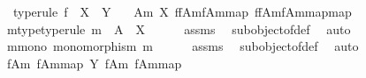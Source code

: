\begin{isabellebody}
\ \ type{\isacharunderscore}{\kern0pt}rule{\isacharbrackright}{\kern0pt}{\isacharcolon}{\kern0pt}\ {\isachardoublequoteopen}f\ {\isacharcolon}{\kern0pt}\ X\ {\isasymrightarrow}\ Y{\isachardoublequoteclose}\isanewline
\ \ \ {\isachardoublequoteopen}{\isacharparenleft}{\kern0pt}A{\isacharcomma}{\kern0pt}m{\isacharparenright}{\kern0pt}\ {\isasymsubseteq}\isactrlbsub X\isactrlesub \ {\isacharparenleft}{\kern0pt}f\isactrlsup {\isacharminus}{\kern0pt}f{\isasymlparr}A{\isasymrparr}\isactrlbsub m\isactrlesub {\isasymrparr}\isactrlbsub {\isacharbrackleft}{\kern0pt}f{\isasymlparr}A{\isasymrparr}\isactrlbsub m\isactrlesub {\isacharbrackright}{\kern0pt}map\isactrlesub {\isacharcomma}{\kern0pt}\ {\isacharbrackleft}{\kern0pt}f\isactrlsup {\isacharminus}{\kern0pt}f{\isasymlparr}A{\isasymrparr}\isactrlbsub m\isactrlesub {\isasymrparr}\isactrlbsub {\isacharbrackleft}{\kern0pt}f{\isasymlparr}A{\isasymrparr}\isactrlbsub m\isactrlesub {\isacharbrackright}{\kern0pt}map\isactrlesub {\isacharbrackright}{\kern0pt}map{\isacharparenright}{\kern0pt}{\isachardoublequoteclose}\isanewline
%
\isadelimproof
%
\endisadelimproof
%
\isatagproof
{}\isamarkupfalse%
\ {\isacharminus}{\kern0pt}\isanewline
\ \ \isamarkupfalse%
\ m{\isacharunderscore}{\kern0pt}type{\isacharbrackleft}{\kern0pt}type{\isacharunderscore}{\kern0pt}rule{\isacharbrackright}{\kern0pt}{\isacharcolon}{\kern0pt}\ {\isachardoublequoteopen}m\ {\isacharcolon}{\kern0pt}\ A\ {\isasymrightarrow}\ X{\isachardoublequoteclose}\isanewline
\ \ \ \ \isamarkupfalse%
\ assms{\isacharparenleft}{\kern0pt}{}{\isacharparenright}{\kern0pt}\ \isamarkupfalse%
\ subobject{\isacharunderscore}{\kern0pt}of{\isacharunderscore}{\kern0pt}def{}\ \isamarkupfalse%
\ auto\isanewline
\ \ \isamarkupfalse%
\ m{\isacharunderscore}{\kern0pt}mono{\isacharcolon}{\kern0pt}\ {\isachardoublequoteopen}monomorphism\ m{\isachardoublequoteclose}\isanewline
\ \ \ \ \isamarkupfalse%
\ assms{\isacharparenleft}{\kern0pt}{}{\isacharparenright}{\kern0pt}\ \isamarkupfalse%
\ subobject{\isacharunderscore}{\kern0pt}of{\isacharunderscore}{\kern0pt}def{}\ \isamarkupfalse%
\ auto\isanewline
\isanewline
\ \ \isamarkupfalse%
\ {\isachardoublequoteopen}{\isacharparenleft}{\kern0pt}{\isacharparenleft}{\kern0pt}f{\isasymlparr}A{\isasymrparr}\isactrlbsub m\isactrlesub {\isacharcomma}{\kern0pt}\ {\isacharbrackleft}{\kern0pt}f{\isasymlparr}A{\isasymrparr}\isactrlbsub m\isactrlesub {\isacharbrackright}{\kern0pt}map{\isacharparenright}{\kern0pt}\ {\isasymsubseteq}\isactrlbsub Y\isactrlesub \ {\isacharparenleft}{\kern0pt}f{\isasymlparr}A{\isasymrparr}\isactrlbsub m\isactrlesub {\isacharcomma}{\kern0pt}\ {\isacharbrackleft}{\kern0pt}f{\isasymlparr}A{\isasymrparr}\isactrlbsub m\isactrlesub {\isacharbrackright}{\kern0pt}map{\isacharparenright}{\kern0pt}{\isacharparenright}{\kern0pt}{\isachardoublequoteclose}\isanewline

\end{isabellebody}
